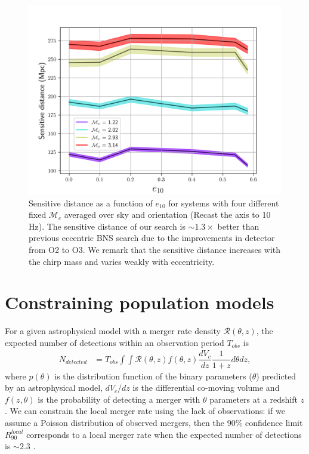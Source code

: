 \begin{figure}[h]
    \centering
    \includegraphics[width=\linewidth]{figures/ecc_search/SENS_DIST_ecc.png}
    \caption{Sensitive distance as a function of $e_{10}$ for systems with four different fixed $\mathcal{M}_c$ averaged over sky and orientation (Recast the axis to 10 Hz). The sensitive distance of our search is $\sim 1.3 \times$ better than previous eccentric BNS search due to the improvements in detector from O2 to O3. We remark that the sensitive distance increases with the chirp mass and varies weakly with eccentricity.}
    \label{fig:sensitive-dist}    
\end{figure}

\section{Constraining population models}

For a given astrophysical model with a merger rate density $\mathcal{R}(\theta, z)$, the expected number of detections within an observation period $T_{obs}$ is 
\begin{align}
    N_{detected} & = T_{obs} \int \int \mathcal{R}(\theta,z) f(\theta,z) \dfrac{dV_c}{dz}\dfrac{1}{1+z} d\theta dz ,
    \label{Eq:expected-detections}
\end{align}
where $p(\theta)$ is the distribution function of the binary parameters ($\theta$) predicted by an astrophysical model, $dV_c/dz$ is the differential co-moving volume and $f(z,\theta)$ is the probability of detecting a merger with $\theta$ parameters at a redshift $z$. We can constrain the local merger rate using the lack of observations: if we assume a Poisson distribution of observed mergers, then the 90\% confidence limit $R_{90}^{local}$ corresponds to a local merger rate when the expected number of detections is $\sim 2.3$ \cite{Biswas:2007ni}.



